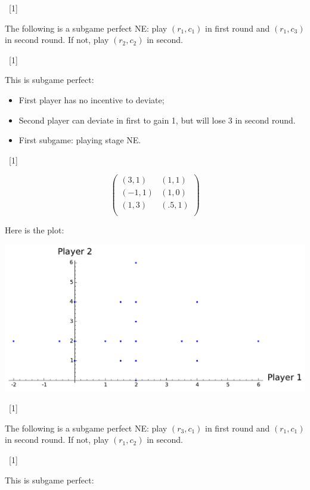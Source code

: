 \documentclass[12pt,a4paper]{article}
\begin{document}
\begin{enumerate}
\begin{enumerate}
            ~\hfill[1]

            The following is a subgame perfect NE: play \((r_1, c_1)\) in first
            round and \((r_1, c_3)\) in second round. If not, play \((r_2, c_2)\) in
            second.

            ~\hfill[1]

            This is subgame perfect:

            \begin{itemize}
                \item First player has no incentive to deviate;
                \item Second player can deviate in first to gain 1, but will
                    lose 3 in second round.
                \item First subgame: playing stage NE.
            \end{itemize}

            ~\hfill[1]

            \[
                \begin{pmatrix}
                    (3,1) & (1,1)\\
                    (-1,1) & (1,0)\\
                    (1,3) & (.5,1)\\
                \end{pmatrix}
            \]

            Here is the plot:

            \begin{center}
                \includegraphics[width=.6\textwidth]{plots/resit-sol-2013-2014-plt02.pdf}
            \end{center}

            ~\hfill[1]

            The following is a subgame perfect NE: play \((r_3, c_1)\) in first
            round and \((r_1, c_1)\) in second round. If not, play \((r_1, c_2)\) in second.

            ~\hfill[1]

            This is subgame perfect:


\end{enumerate}
\end{enumerate}
\end{document}
